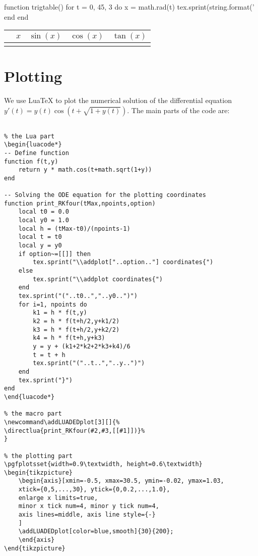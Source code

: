 \documentclass[a4paper]{article}
\begin{document}
\begin{luacode*}
function trigtable()
    for t = 0, 45, 3 do
        x = math.rad(t)
        tex.sprint(string.format('%
    end
end
\end{luacode*}
\newcommand{\trigtable}{\luadirect{trigtable()}}

\begin{tabular}{rcccc}
\hline
& $x$ & $\sin(x)$ & $\cos(x)$ & $\tan(x)$ \\
\hline
\trigtable
\hline
\end{tabular}


\section{Plotting}

We use LuaTeX to plot the numerical solution of the differential equation $y'(t) = y(t) \cos \left( t + \sqrt{1 + y(t)}\right) $. The main parts of the code are:

\begin{verbatim}

% the Lua part
\begin{luacode*}
-- Define function
function f(t,y)
    return y * math.cos(t+math.sqrt(1+y))
end

-- Solving the ODE equation for the plotting coordinates
function print_RKfour(tMax,npoints,option)
    local t0 = 0.0
    local y0 = 1.0
    local h = (tMax-t0)/(npoints-1)
    local t = t0
    local y = y0
    if option~=[[]] then
        tex.sprint("\\addplot["..option.."] coordinates{")
    else
        tex.sprint("\\addplot coordinates{")
    end
    tex.sprint("("..t0..","..y0..")")
    for i=1, npoints do
        k1 = h * f(t,y)
        k2 = h * f(t+h/2,y+k1/2)
        k3 = h * f(t+h/2,y+k2/2)
        k4 = h * f(t+h,y+k3)
        y = y + (k1+2*k2+2*k3+k4)/6
        t = t + h
        tex.sprint("("..t..","..y..")")
    end
    tex.sprint("}")
end
\end{luacode*}

% the macro part
\newcommand\addLUADEDplot[3][]{%
\directlua{print_RKfour(#2,#3,[[#1]])}%
}

% the plotting part
\pgfplotsset{width=0.9\textwidth, height=0.6\textwidth}
\begin{tikzpicture}
    \begin{axis}[xmin=-0.5, xmax=30.5, ymin=-0.02, ymax=1.03,
    xtick={0,5,...,30}, ytick={0,0.2,...,1.0},
    enlarge x limits=true,
    minor x tick num=4, minor y tick num=4,
    axis lines=middle, axis line style={-}
    ]
    \addLUADEDplot[color=blue,smooth]{30}{200};
    \end{axis}
\end{tikzpicture}

\end{verbatim}
\end{document}
